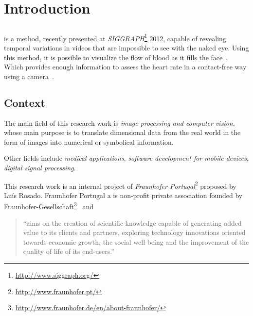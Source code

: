 \chapter{Introduction} \label{chap:intro}

\section*{}


\evm{} is a method, recently presented at 
\emph{SIGGRAPH}\footnote{\url{http://www.siggraph.org/}} 2012, capable of 
revealing temporal variations in videos that are impossible to see 
with the naked eye. Using this method, it is possible to visualize 
the flow of blood as it fills the face~\cite{Wu2012Eulerian}. 
Which provides enough information to assess the heart rate in a 
contact-free way using a camera~\cite{Wu2012Eulerian, 
Poh2010Non, Poh2011Advancements, Philips2013}.

\section{Context} \label{sec:context}

The main field of this research work is \emph{image processing 
and computer vision}, whose main purpose is to translate dimensional 
data from the real world in the form of images into numerical 
or symbolical information.

Other fields include \emph{medical applications}, \emph{software 
development for mobile devices}, \emph{digital signal processing}.

This research work is an internal project of \emph{Fraunhofer 
Portugal}\footnote{\url{http://www.fraunhofer.pt/}} proposed by 
Luís Rosado. Fraunhofer Portugal a is non-profit private association 
founded by Fraunhofer-Gesellschaft\footnote{\url{http://www.fraunhofer.de/en/about-fraunhofer/}}~\cite{Fraunhofer2013} and

\begin{quote}
  ``aims on the creation of scientific knowledge capable of 
  generating added value to its clients and partners, exploring 
  technology innovations oriented towards economic growth, the 
  social well-being and the improvement of the quality of life of 
  its end-users.''~\cite{Fraunhofer2013}
\end{quote}

